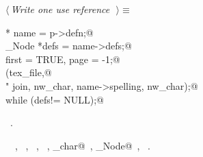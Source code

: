 \documentclass{report}
\begin{document}
\begin{flushleft} \small
\begin{minipage}{\linewidth} \label{scrap231}
$\langle\,${\it Write one use reference}\nobreak\ {\footnotesize {}}$\,\rangle\equiv$
\vspace{-1ex}
\begin{list}{}{} \item
\mbox{}\verb@Name * name = p->defn;@\\
\mbox{}\verb@Scrap_Node *defs = name->defs;@\\
\mbox{}\verb@int first = TRUE, page = -1;@\\
\mbox{}\verb@fprintf(tex_file,@\\
\mbox{}\verb@        "%c \\verb%c%s%c\\nobreak\\ ",@\\
\mbox{}\verb@        join, nw_char, name->spelling, nw_char);@\\
\mbox{}while (defs!= NULL);@\\
\mbox{}\verb@@{\NWsep}
\end{list}
\vspace{-1ex}
\footnotesize\addtolength{\baselineskip}{-1ex}
\begin{list}{}{\setlength{\itemsep}{-\parsep}\setlength{\itemindent}{-\leftmargin}}
\item \NWtxtMacroRefIn\ .
\end{list}
\vspace{-2ex}
\footnotesize\addtolength{\baselineskip}{-1ex}
\begin{list}{}{\setlength{\itemsep}{-\parsep}\setlength{\itemindent}{-\leftmargin}}
\item \NWtxtIdentsUsed\nobreak\  \verb@FALSE@\nobreak\ , \verb@first@\nobreak\ , \verb@fprintf@\nobreak\ , \verb@Name@\nobreak\ , \verb@nw_char@\nobreak\ , \verb@Scrap_Node@\nobreak\ , \verb@TRUE@\nobreak\ .\end{list}
\end{minipage}\\[4ex]
\end{flushleft}
\end{document}
